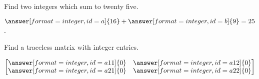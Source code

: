 \documentclass{ximera}
\begin{document}
\begin{problem}
  Find two integers which sum to twenty five.

  \begin{validator}[a+b==25]
    $\answer[format=integer,id=a]{16} + \answer[format=integer,id=b]{9} = 25$.
  \end{validator}


  Find a traceless matrix with integer entries.
  \begin{validator}[a11+a22==0]
    \[
      \begin{bmatrix}
        \answer[format=integer,id=a11]{0} &         \answer[format=integer,id=a12]{0} \\
        \answer[format=integer,id=a21]{0} &         \answer[format=integer,id=a22]{0} \\
      \end{bmatrix}
      \]
  \end{validator}

\end{problem}
\end{document}
